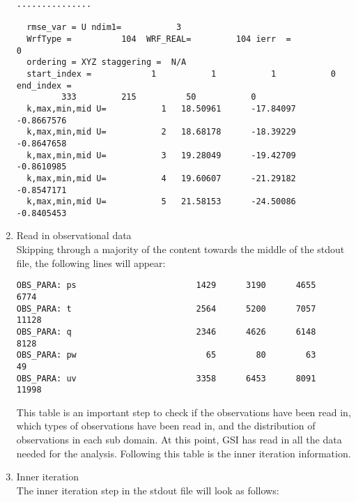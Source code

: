 \begin{enumerate}
\begin{scriptsize}
\begin{verbatim}
...............

  rmse_var = U ndim1=           3
  WrfType =          104  WRF_REAL=         104 ierr  =            0
  ordering = XYZ staggering =  N/A
  start_index =            1           1           1           0  end_index =
         333         215          50           0
  k,max,min,mid U=           1   18.50961      -17.84097     -0.8667576
  k,max,min,mid U=           2   18.68178      -18.39229     -0.8647658
  k,max,min,mid U=           3   19.28049      -19.42709     -0.8610985
  k,max,min,mid U=           4   19.60607      -21.29182     -0.8547171
  k,max,min,mid U=           5   21.58153      -24.50086     -0.8405453
\end{verbatim}
\end{scriptsize}

\item Read in observational data\\

Skipping through a majority of the content towards the middle of the stdout file, the following lines will appear:

\begin{scriptsize}
\begin{verbatim}
OBS_PARA: ps                        1429      3190      4655      6774
OBS_PARA: t                         2564      5200      7057     11128
OBS_PARA: q                         2346      4626      6148      8128
OBS_PARA: pw                          65        80        63        49
OBS_PARA: uv                        3358      6453      8091     11998
\end{verbatim}
\end{scriptsize}

This table is an important step to check if the observations have been read in, which types of observations have been read in, and the distribution of observations in each sub domain.  At this point, GSI has read in all the data needed for the analysis.  Following this table is the inner iteration information.\\ 

\item Inner iteration\\

The inner iteration step in the stdout file will look as follows:


\end{enumerate}
